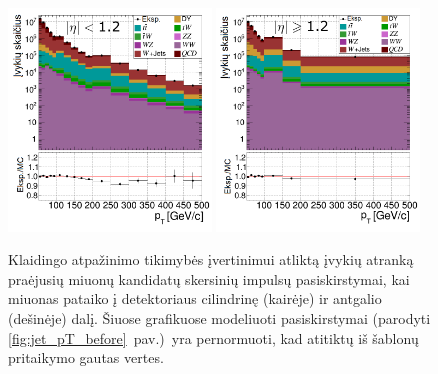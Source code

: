 \documentclass[a4paper, 12pt, oneside]{article}
\begin{document}
\begin{figure}[p!]
	\includegraphics[width=0.48\textwidth]{Kursinis3/FRfit_pT_deno_barrel.png}
	\includegraphics[width=0.48\textwidth]{Kursinis3/FRfit_pT_deno_endcap.png}
	\vspace{-0.4cm}
	\caption{\label{fig:jet_pT_after}
		Klaidingo atpažinimo tikimybės įvertinimui atliktą įvykių atranką praėjusių miuonų kandidatų skersinių impulsų
		pasiskirstymai, kai miuonas pataiko į detektoriaus cilindrinę (kairėje) ir antgalio (dešinėje) dalį.
		Šiuose grafikuose modeliuoti pasiskirstymai (parodyti \ref{fig:jet_pT_before}~pav.)\ yra pernormuoti, kad
		atitiktų iš šablonų pritaikymo gautas vertes.}
\end{figure}
\end{document}
